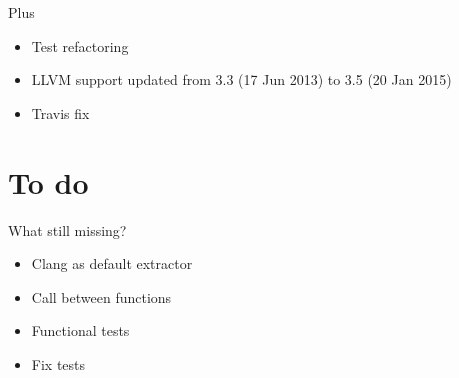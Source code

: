 \begin{frame}{Plus}

\begin{itemize}
    \item Test refactoring
    \item LLVM support updated from 3.3 (17 Jun 2013) to 3.5 (20 Jan 2015)
    \item Travis fix
\end{itemize}
    
\end{frame}

\section{To do} %
\label{sec:analizo}

\begin{frame}{What still missing?}
    \begin{itemize} 
        \item Clang as default extractor
        \item Call between functions   
        \item Functional tests
        \item Fix tests
    \end{itemize}
\end{frame}
